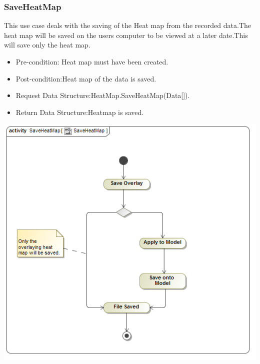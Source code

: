 	\subsubsection{SaveHeatMap}
	This use case deals with the saving of the Heat map from the recorded data.The heat map will be saved on the users computer to be viewed at a later date.This will save only the heat map.
	\begin{itemize}
		\item Pre-condition: Heat map must have been created.
		\item Post-condition:Heat map of the data is saved.
		\item Request Data Structure:HeatMap.SaveHeatMap(Data[]).
		\item Return Data Structure:Heatmap is saved.
	\end{itemize}
	\includegraphics[scale=0.5]{Diagrams/Activity_Diagram__SaveHeatMap__SaveHeatMap.png}
	
	
